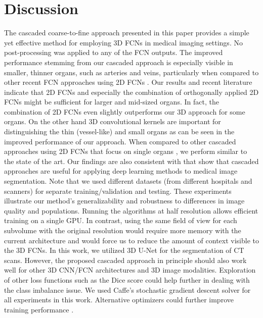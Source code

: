 \documentclass[authoryear]{elsarticle}
\begin{document}
\section{Discussion}
The cascaded coarse-to-fine approach presented in this paper provides a simple yet effective method for employing 3D FCNs in medical imaging settings. No post-processing was applied to any of the FCN outputs. The improved performance stemming from our cascaded approach is especially visible in smaller, thinner organs, such as arteries and veins, particularly when compared to other recent FCN approaches using 2D FCNs \citep{zhou2016three}. Our results and recent literature indicate that 2D FCNs and especially the combination of orthogonally applied 2D FCNs \citep{zhou2016three,roth2017spatial,zhou2016pancreas} might be sufficient for larger and mid-sized organs. In fact, the combination of 2D FCNs even slightly outperforms our 3D approach for some organs. On the other hand 3D convolutional kernels are important for distinguishing the thin (vessel-like) and small organs as can be seen in the improved performance of our approach. When compared to other cascaded approaches using 2D FCNs that focus on single organs \citep{roth2017spatial,zhou2016pancreas}, we perform similar to the state of the art. Our findings are also consistent with \citep{roth2017spatial,zhou2016pancreas} that show that cascaded approaches are useful for applying deep learning methods to medical image segmentation. Note that we used different datasets (from different hospitals and scanners) for separate training/validation and testing. These experiments illustrate our method\rq{}s generalizability and robustness to differences in image quality and populations. Running the algorithms at half resolution allows efficient training on a single GPU. In contrast, using the same field of view for each subvolume with the original resolution would require  more memory with the current architecture and would force us to reduce the amount of context visible to the 3D FCNs. In this work, we utilized 3D U-Net for the segmentation of CT scans. However, the proposed cascaded approach in principle should also work well for other 3D CNN/FCN architectures and 3D image modalities. Exploration of other loss functions such as the Dice score \citep{milletari2016v,li2017compactness} could help further in dealing with the class imbalance issue. We used Caffe's stochastic gradient descent solver \citep{jia2014caffe} for all experiments in this work. Alternative optimizers could further improve training performance \citep{kingma2014adam}. 
\end{document}
